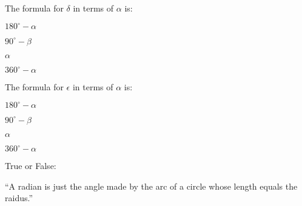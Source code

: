 \documentclass[noauthor,nooutcomes]{ximera}
\begin{document}
\begin{exercise}
 The formula for $\delta$ in terms of $\alpha$ is:
 
\begin{enumerate}
\begin{multicols}{2}
 \item $180^\circ-\alpha$
 \item $90^\circ-\beta$
 \item $\alpha$
 \item $360^\circ-\alpha$
\end{multicols}
\end{enumerate}
\end{exercise}

\begin{exercise}
 The formula for $\epsilon$ in terms of $\alpha$ is:
 
\begin{enumerate}
\begin{multicols}{2}
 \item $180^\circ-\alpha$
 \item $90^\circ-\beta$
 \item $\alpha$
 \item $360^\circ-\alpha$
\end{multicols}
\end{enumerate}
\end{exercise}

\begin{exercise}
  True or False:

  ``A radian is just the angle made by the arc of a circle whose
  length equals the raidus.''
\end{exercise}

\end{document}
